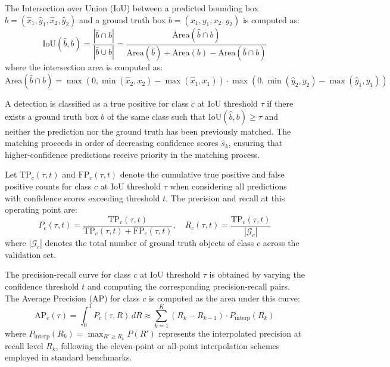 The Intersection over Union (IoU) between a predicted bounding box $\hat{b} = (\hat{x}_1, \hat{y}_1, \hat{x}_2, \hat{y}_2)$ and a ground truth box $b = (x_1, y_1, x_2, y_2)$ is computed as:
\begin{equation}
\text{IoU}(\hat{b}, b) = \frac{|\hat{b} \cap b|}{|\hat{b} \cup b|} = \frac{\text{Area}(\hat{b} \cap b)}{\text{Area}(\hat{b}) + \text{Area}(b) - \text{Area}(\hat{b} \cap b)}
\label{eq:iou_definition}
\end{equation}
where the intersection area is computed as:
\begin{equation}
\text{Area}(\hat{b} \cap b) = \max(0, \min(\hat{x}_2, x_2) - \max(\hat{x}_1, x_1)) \cdot \max(0, \min(\hat{y}_2, y_2) - \max(\hat{y}_1, y_1))
\end{equation}

A detection is classified as a true positive for class $c$ at IoU threshold $\tau$ if there exists a ground truth box $b$ of the same class such that $\text{IoU}(\hat{b}, b) \geq \tau$ and neither the prediction nor the ground truth has been previously matched. The matching proceeds in order of decreasing confidence scores $\hat{s}_k$, ensuring that higher-confidence predictions receive priority in the matching process.

Let $\text{TP}_c(\tau, t)$ and $\text{FP}_c(\tau, t)$ denote the cumulative true positive and false positive counts for class $c$ at IoU threshold $\tau$ when considering all predictions with confidence scores exceeding threshold $t$. The precision and recall at this operating point are:
\begin{equation}
P_c(\tau, t) = \frac{\text{TP}_c(\tau, t)}{\text{TP}_c(\tau, t) + \text{FP}_c(\tau, t)}, \quad R_c(\tau, t) = \frac{\text{TP}_c(\tau, t)}{|\mathcal{G}_c|}
\label{eq:precision_recall}
\end{equation}
where $|\mathcal{G}_c|$ denotes the total number of ground truth objects of class $c$ across the validation set.

The precision-recall curve for class $c$ at IoU threshold $\tau$ is obtained by varying the confidence threshold $t$ and computing the corresponding precision-recall pairs. The Average Precision (AP) for class $c$ is computed as the area under this curve:
\begin{equation}
\text{AP}_c(\tau) = \int_0^1 P_c(\tau, R) \, dR \approx \sum_{k=1}^{K} (R_k - R_{k-1}) \cdot P_{\text{interp}}(R_k)
\label{eq:average_precision}
\end{equation}
where $P_{\text{interp}}(R_k) = \max_{R' \geq R_k} P(R')$ represents the interpolated precision at recall level $R_k$, following the eleven-point or all-point interpolation schemes employed in standard benchmarks.

